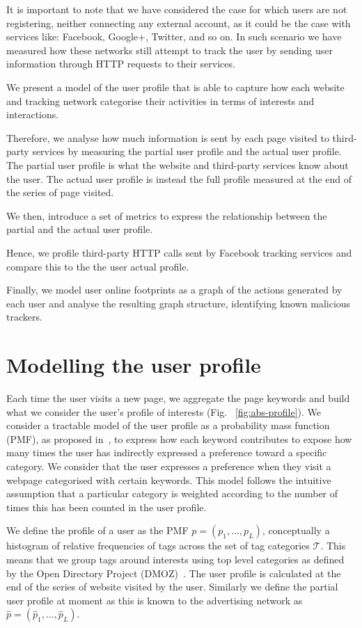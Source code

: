 It is important to note that we have considered the case for which users are not registering, neither connecting any external account, as it could be the case with services like: Facebook, Google+, Twitter, and so on. In such scenario we have measured how these networks still attempt to track the user by sending user information through HTTP requests to their services.

We present a model of the user profile that is able to capture how each website and tracking network categorise their activities in terms of interests and interactions.

Therefore, we analyse how much information is sent by each page visited to third-party services by measuring the partial user profile and the actual user profile. The partial user profile is what the website and third-party services know about the user. The actual user profile is instead the full profile measured at the end of the series of page visited.

We then, introduce a set of metrics to express the relationship between the partial and the actual user profile.

Hence, we profile third-party HTTP calls sent by Facebook tracking services and compare this to the the user actual profile.

Finally, we model user online footprints as a graph of the actions generated by each user and analyse the resulting graph structure, identifying known malicious trackers.

\section{Modelling the user profile}
\label{sec:mod-profile}
\noindent
Each time the user visits a new page, we aggregate the page keywords and build what we consider the user's profile of interests (Fig. ~\ref{fig:abs-profile}). We consider a tractable model of the user profile as a probability mass function (PMF), as proposed in~\cite{parra2012optimal,Parra12TKDE}, to express how each keyword contributes to expose how many times the user has indirectly expressed a preference toward a specific category. We consider that the user expresses a preference when they visit a webpage categorised with certain keywords. This model follows the intuitive assumption that a particular category is weighted according to the number of times this has been counted in the user profile.

We define the profile of a user as the PMF $p = (p_1,\ldots, p_L)$, conceptually a histogram of relative frequencies of tags across the set of tag categories $\mathcal{T}$. This means that we group tags around interests using top level categories as defined by the Open Directory Project (DMOZ)~\cite{a22}.
The user profile is calculated at the end of the series of website visited by the user. Similarly we define the partial user profile at moment as this is known to the advertising network as  $\hat{p} = (\hat{p}_1,\ldots, \hat{p}_L)$.

